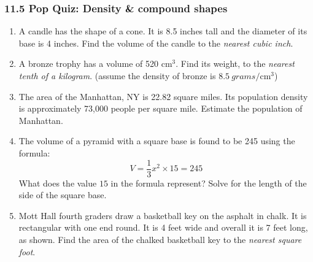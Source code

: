 \documentclass[12pt, twoside]{article}
\begin{document}
\subsubsection*{11.5 Pop Quiz: Density \& compound shapes}
 \begin{enumerate}

\item A candle has the shape of a cone. It is 8.5 inches tall and the diameter of its base is 4 inches. Find the volume of the candle to the \emph{nearest cubic inch}. \vspace{3cm}

\item A bronze trophy has a volume of 520 cm$^3$. Find its weight, to the \emph{nearest tenth of a kilogram}. (assume the density of bronze is $8.5 \ grams/ \mathrm{cm}^3$) \vspace{2.5cm}

\item The area of the Manhattan, NY is 22.82 square miles. Its population density is approximately 73,000 people per square mile. Estimate the population of Manhattan. \vspace{2.5cm}

\item The volume of a pyramid with a square base is found to be 245 using the formula:
  \[V=\frac{1}{3} x^2 \times 15=245\]
  What does the value $15$ in the formula represent? Solve for the length of the side of the square base. \vspace{7cm}

\newpage
\item Mott Hall fourth graders draw a basketball key on the asphalt in chalk. It is rectangular with one end round. It is 4 feet wide and overall it is 7 feet long, as shown. Find the area of the chalked basketball key to the \emph{nearest square foot}.\\[1.5cm]


\end{enumerate}
\end{document}
